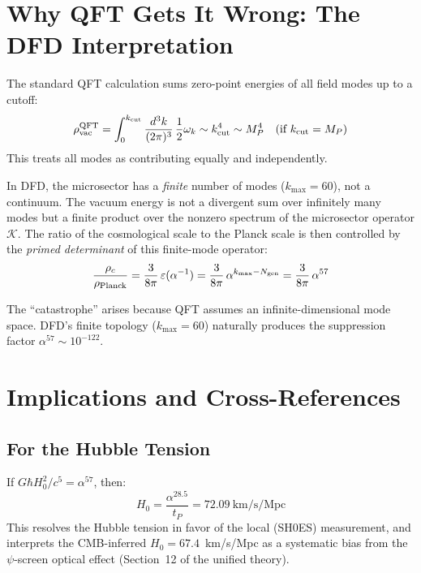 \documentclass[11pt]{article}
\begin{document}
\section{Why QFT Gets It Wrong: The DFD Interpretation}

The standard QFT calculation sums zero-point energies of all field modes up to a cutoff:
\begin{equation}
\rho_{\rm vac}^{\rm QFT} = \int_0^{k_{\rm cut}} \frac{d^3k}{(2\pi)^3}\,\frac{1}{2}\omega_k
\sim k_{\rm cut}^4 \sim M_P^4 \quad (\text{if } k_{\rm cut} = M_P)
\end{equation}
This treats all modes as contributing equally and independently.

In DFD, the microsector has a \emph{finite} number of modes ($k_{\max} = 60$), not a
continuum. The vacuum energy is not a divergent sum over infinitely many modes but a
finite product over the nonzero spectrum of the microsector operator $\mathcal{K}$.
The ratio of the cosmological scale to the Planck scale is then controlled by the
\emph{primed determinant} of this finite-mode operator:
\begin{equation}
\frac{\rho_c}{\rho_{\rm Planck}} = \frac{3}{8\pi}\,\varepsilon(\alpha^{-1})
= \frac{3}{8\pi}\,\alpha^{k_{\max} - N_{\rm gen}}
= \frac{3}{8\pi}\,\alpha^{57}
\end{equation}

The ``catastrophe'' arises because QFT assumes an infinite-dimensional mode space.
DFD's finite topology ($k_{\max} = 60$) naturally produces the suppression factor
$\alpha^{57} \sim 10^{-122}$.

\section{Implications and Cross-References}

\subsection{For the Hubble Tension}

If $G\hbar H_0^2/c^5 = \alpha^{57}$, then:
\begin{equation}
H_0 = \frac{\alpha^{28.5}}{t_P} = 72.09~\text{km/s/Mpc}
\end{equation}
This resolves the Hubble tension in favor of the local (SH0ES) measurement, and
interprets the CMB-inferred $H_0 = 67.4$~km/s/Mpc as a systematic bias from the
$\psi$-screen optical effect (Section~12 of the unified theory).
\end{document}
